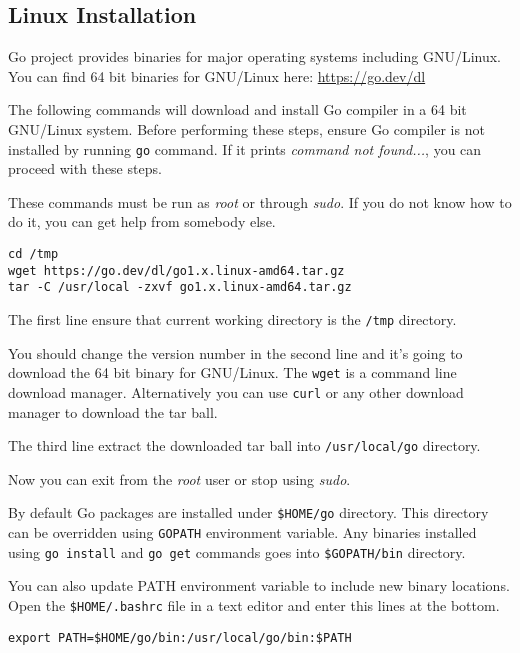 \subsection{Linux Installation}

Go project provides binaries for major operating systems including GNU/Linux.
You can find 64 bit binaries for GNU/Linux here: \url{https://go.dev/dl}

The following commands will download and install Go
compiler in a 64 bit GNU/Linux system. Before performing these steps, ensure Go
compiler is not installed by running \texttt{go} command. If it
prints \textit{command not found...}, you can proceed with these steps.

These commands must be run as \textit{root} or through \textit{sudo}. If you do
not know how to do it, you can get help from somebody else.

\begin{lstlisting}[numbers=none]
cd /tmp
wget https://go.dev/dl/go1.x.linux-amd64.tar.gz
tar -C /usr/local -zxvf go1.x.linux-amd64.tar.gz
\end{lstlisting}

The first line ensure that current working directory is the \texttt{/tmp}
directory.

You should change the version number in the second line and it's going to
download the 64 bit binary for GNU/Linux. The \texttt{wget} is a command line
download manager. Alternatively you can use \texttt{curl} or any other download
manager to download the tar ball.

The third line extract the downloaded tar ball into \texttt{/usr/local/go}
directory.

Now you can exit from the \textit{root} user or stop using \textit{sudo}.

By default Go packages are installed under \texttt{\$HOME/go} directory. This
directory can be overridden using \texttt{GOPATH} environment variable. Any
binaries installed using \texttt{go install} and \texttt{go get} commands goes
into \texttt{\$GOPATH/bin} directory.

You can also update PATH environment variable to include new binary locations.
Open the \texttt{\$HOME/.bashrc} file in a text editor and enter this lines at
the bottom.

\begin{lstlisting}[numbers=none]
export PATH=$HOME/go/bin:/usr/local/go/bin:$PATH
\end{lstlisting}

